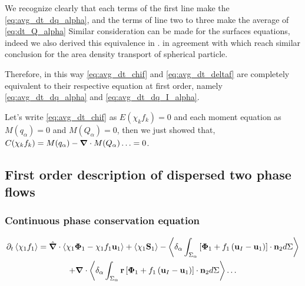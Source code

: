We recognize clearly that each terms of the first line make the \ref{eq:avg_dt_dq_alpha}, and the terms of line two to three make the average of \ref{eq:dt_Q_alpha}
Similar consideration can be made for the surfaces equations, indeed we also derived this equivalence in . 
 in agreement with \cite{lhuillier2000bilan} which reach similar conclusion for the area density transport of spherical particle. 

Therefore, in this way \ref{eq:avg_dt_chif} and \ref{eq:avg_dt_deltaf} are completely equivalent to their respective equation at first order, namely \ref{eq:avg_dt_dq_alpha} and \ref{eq:avg_dt_dq_I_alpha}. 

Let's write \ref{eq:avg_dt_chif} as $E(\chi_k f_k) = 0 $ and each moment equation as $M(q_\alpha) = 0$ and $M(Q_\alpha) =0$, then we just showed that, $C(\chi_k f_k) = M(q_\alpha) - \bm{\nabla} \cdot M(Q_\alpha) \ldots = 0$. 


\subsection{First order description of dispersed two phase flows}

\subsubsection{Continuous phase conservation equation}
\begin{multline}
    \partial_t \left<\chi_1 f_1\right>
    = \hat{\bm{\nabla}} \cdot \left<\chi_1 \bm{\Phi}_1 - \chi_1 f_1 \textbf{u}_1\right>
    + \left<\chi_1 \textbf{S}_1\right>
    - \left<\delta_\alpha \int_{\Sigma_\alpha}\left[
        \mathbf{\Phi}_1
        + f_1
        \left(
            \textbf{u}_I
            - \textbf{u}_1
        \right)
    \right]
    \cdot \textbf{n}_2d\Sigma\right> \\
    +  \bm{\nabla} \cdot \left<\delta_\alpha \int_{\Sigma_\alpha} \textbf{r}\left[
        \mathbf{\Phi}_1
        + f_1
        \left(
            \textbf{u}_I
            - \textbf{u}_1
        \right)
    \right]
    \cdot \textbf{n}_2d\Sigma\right> \ldots
    \label{eq:hybrid_avg_dt_chif}
\end{multline}
